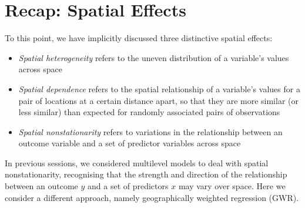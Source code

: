 \documentclass[
]{book}
\newenvironment{Shaded}{\begin{snugshade}}{\end{snugshade}}
\newcommand{\CommentTok}[1]{\textcolor[rgb]{0.56,0.35,0.01}{\textit{#1}}}
\newcommand{\DataTypeTok}[1]{\textcolor[rgb]{0.13,0.29,0.53}{#1}}
\newcommand{\DecValTok}[1]{\textcolor[rgb]{0.00,0.00,0.81}{#1}}
\newcommand{\FloatTok}[1]{\textcolor[rgb]{0.00,0.00,0.81}{#1}}
\newcommand{\KeywordTok}[1]{\textcolor[rgb]{0.13,0.29,0.53}{\textbf{#1}}}
\newcommand{\NormalTok}[1]{#1}
\newcommand{\OperatorTok}[1]{\textcolor[rgb]{0.81,0.36,0.00}{\textbf{#1}}}
\newcommand{\StringTok}[1]{\textcolor[rgb]{0.31,0.60,0.02}{#1}}
\begin{document}
\begin{Shaded}
\end{Shaded}

\hypertarget{recap-spatial-effects}{%
\section{Recap: Spatial Effects}\label{recap-spatial-effects}}

To this point, we have implicitly discussed three distinctive spatial effects:

\begin{itemize}
\item
  \emph{Spatial heterogeneity} refers to the uneven distribution of a variable's values across space
\item
  \emph{Spatial dependence} refers to the spatial relationship of a variable's values for a pair of locations at a certain distance apart, so that they are more similar (or less similar) than expected for randomly associated pairs of observations
\item
  \emph{Spatial nonstationarity} refers to variations in the relationship between an outcome variable and a set of predictor variables across space
\end{itemize}

In previous sessions, we considered multilevel models to deal with spatial nonstationarity, recognising that the strength and direction of the relationship between an outcome \(y\) and a set of predictors \(x\) may vary over space. Here we consider a different approach, namely geographically weighted regression (GWR).
\end{document}
